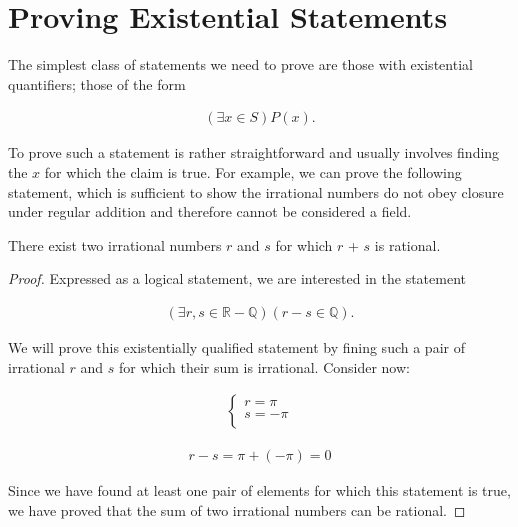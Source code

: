 \section{Proving Existential Statements}

The simplest class of statements we need to prove are those with existential quantifiers; those of the form

\begin{align*}
	(\exists x \in S)P(x).
\end{align*}

To prove such a statement is rather straightforward and usually involves finding the $x$ for which the claim is true. For example, we can prove the following statement, which is sufficient to show the irrational numbers do not obey closure under regular addition and therefore cannot be considered a field.

\vspace{\baselineskip}
\begin{theorem}
	There exist two irrational numbers $r$ and $s$ for which $r$ + $s$ is rational.
\end{theorem}
\begin{proof}
	Expressed as a logical statement, we are interested in the statement
	
	\begin{align*}
		(\exists r, s \in \mathbb{R} - \mathbb{Q})(r - s \in \mathbb{Q}).
	\end{align*}
	
	We will prove this existentially qualified statement by fining such a pair of irrational $r$ and $s$ for which their sum is irrational. Consider now:
	
	\begin{align*}
		\begin{cases}
			r = \pi \\
			s = -\pi \\
		\end{cases}
	\end{align*}
	
	\begin{align*}
		r - s = \pi + (-\pi) = 0
	\end{align*}
	
	Since we have found at least one pair of elements for which this statement is true, we have proved that the sum of two irrational numbers can be rational.
\end{proof}
\vspace{\baselineskip}

